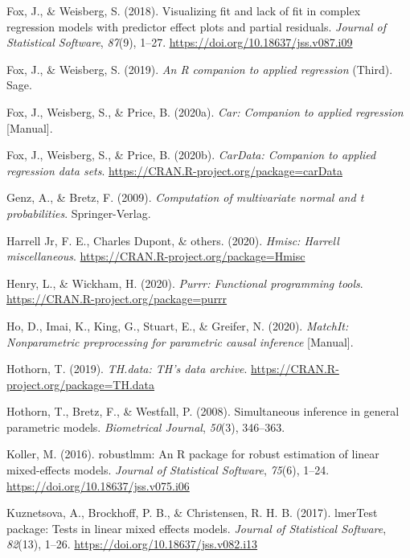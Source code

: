 \documentclass[
  english,
  man, noextraspace,floatsintext]{apa7}
\begin{document}
\begin{appendix}
\leavevmode\hypertarget{ref-R-effects_a}{}%
Fox, J., \& Weisberg, S. (2018). Visualizing fit and lack of fit in
complex regression models with predictor effect plots and partial
residuals. \emph{Journal of Statistical Software}, \emph{87}(9), 1--27.
\url{https://doi.org/10.18637/jss.v087.i09}

\leavevmode\hypertarget{ref-car2019}{}%
Fox, J., \& Weisberg, S. (2019). \emph{An R companion to applied
regression} (Third). Sage.

\leavevmode\hypertarget{ref-R-car}{}%
Fox, J., Weisberg, S., \& Price, B. (2020a). \emph{Car: Companion to
applied regression} {[}Manual{]}.

\leavevmode\hypertarget{ref-R-carData}{}%
Fox, J., Weisberg, S., \& Price, B. (2020b). \emph{CarData: Companion to
applied regression data sets}.
\url{https://CRAN.R-project.org/package=carData}

\leavevmode\hypertarget{ref-R-mvtnorm}{}%
Genz, A., \& Bretz, F. (2009). \emph{Computation of multivariate normal
and t probabilities}. Springer-Verlag.

\leavevmode\hypertarget{ref-R-Hmisc}{}%
Harrell Jr, F. E., Charles Dupont, \& others. (2020). \emph{Hmisc:
Harrell miscellaneous}. \url{https://CRAN.R-project.org/package=Hmisc}

\leavevmode\hypertarget{ref-R-purrr}{}%
Henry, L., \& Wickham, H. (2020). \emph{Purrr: Functional programming
tools}. \url{https://CRAN.R-project.org/package=purrr}

\leavevmode\hypertarget{ref-R-MatchIt}{}%
Ho, D., Imai, K., King, G., Stuart, E., \& Greifer, N. (2020).
\emph{MatchIt: Nonparametric preprocessing for parametric causal
inference} {[}Manual{]}.

\leavevmode\hypertarget{ref-R-TH.data}{}%
Hothorn, T. (2019). \emph{TH.data: TH's data archive}.
\url{https://CRAN.R-project.org/package=TH.data}

\leavevmode\hypertarget{ref-R-multcomp}{}%
Hothorn, T., Bretz, F., \& Westfall, P. (2008). Simultaneous inference
in general parametric models. \emph{Biometrical Journal}, \emph{50}(3),
346--363.

\leavevmode\hypertarget{ref-R-robustlmm}{}%
Koller, M. (2016). robustlmm: An R package for robust estimation of
linear mixed-effects models. \emph{Journal of Statistical Software},
\emph{75}(6), 1--24. \url{https://doi.org/10.18637/jss.v075.i06}

\leavevmode\hypertarget{ref-R-lmerTest}{}%
Kuznetsova, A., Brockhoff, P. B., \& Christensen, R. H. B. (2017).
lmerTest package: Tests in linear mixed effects models. \emph{Journal of
Statistical Software}, \emph{82}(13), 1--26.
\url{https://doi.org/10.18637/jss.v082.i13}


\end{appendix}
\end{document}
